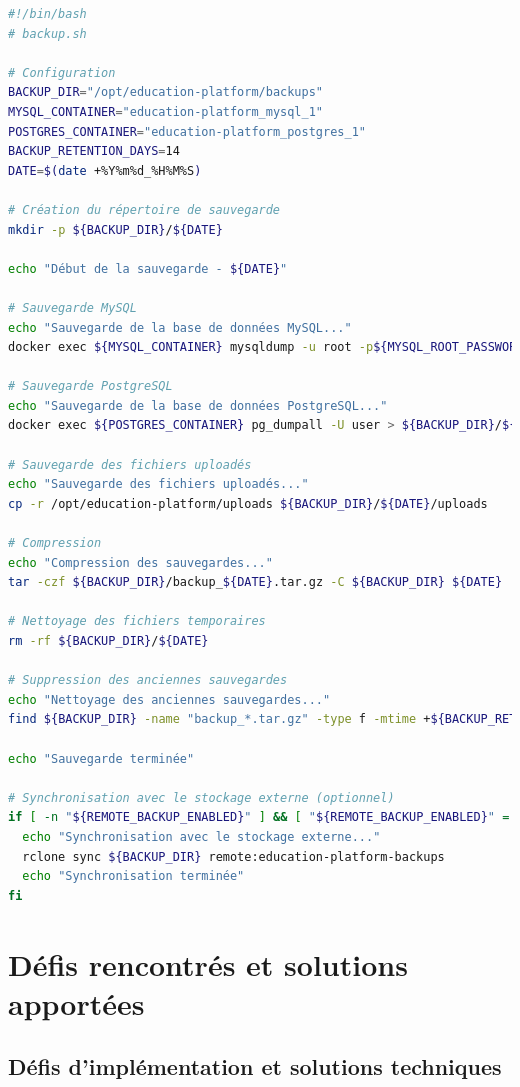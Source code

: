 \begin{lstlisting}[style=codestyle, language=bash]
#!/bin/bash
# backup.sh

# Configuration
BACKUP_DIR="/opt/education-platform/backups"
MYSQL_CONTAINER="education-platform_mysql_1"
POSTGRES_CONTAINER="education-platform_postgres_1"
BACKUP_RETENTION_DAYS=14
DATE=$(date +%Y%m%d_%H%M%S)

# Création du répertoire de sauvegarde
mkdir -p ${BACKUP_DIR}/${DATE}

echo "Début de la sauvegarde - ${DATE}"

# Sauvegarde MySQL
echo "Sauvegarde de la base de données MySQL..."
docker exec ${MYSQL_CONTAINER} mysqldump -u root -p${MYSQL_ROOT_PASSWORD} --all-databases > ${BACKUP_DIR}/${DATE}/mysql_backup.sql

# Sauvegarde PostgreSQL
echo "Sauvegarde de la base de données PostgreSQL..."
docker exec ${POSTGRES_CONTAINER} pg_dumpall -U user > ${BACKUP_DIR}/${DATE}/postgres_backup.sql

# Sauvegarde des fichiers uploadés
echo "Sauvegarde des fichiers uploadés..."
cp -r /opt/education-platform/uploads ${BACKUP_DIR}/${DATE}/uploads

# Compression
echo "Compression des sauvegardes..."
tar -czf ${BACKUP_DIR}/backup_${DATE}.tar.gz -C ${BACKUP_DIR} ${DATE}

# Nettoyage des fichiers temporaires
rm -rf ${BACKUP_DIR}/${DATE}

# Suppression des anciennes sauvegardes
echo "Nettoyage des anciennes sauvegardes..."
find ${BACKUP_DIR} -name "backup_*.tar.gz" -type f -mtime +${BACKUP_RETENTION_DAYS} -delete

echo "Sauvegarde terminée"

# Synchronisation avec le stockage externe (optionnel)
if [ -n "${REMOTE_BACKUP_ENABLED}" ] && [ "${REMOTE_BACKUP_ENABLED}" = "true" ]; then
  echo "Synchronisation avec le stockage externe..."
  rclone sync ${BACKUP_DIR} remote:education-platform-backups
  echo "Synchronisation terminée"
fi
\end{lstlisting}

\section{Défis rencontrés et solutions apportées}

\subsection{Défis d'implémentation et solutions techniques}

